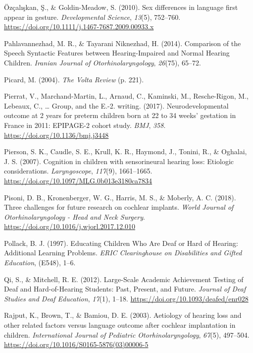 \documentclass[english,man]{apa6}
\begin{document}
\leavevmode\hypertarget{ref-ozcaliskan2010}{}%
Özçalışkan, Ş., \& Goldin-Meadow, S. (2010). Sex differences in language first appear in gesture. \emph{Developmental Science}, \emph{13}(5), 752--760. \url{https://doi.org/10.1111/j.1467-7687.2009.00933.x}

\leavevmode\hypertarget{ref-pahlavannezhad2014}{}%
Pahlavannezhad, M. R., \& Tayarani Niknezhad, H. (2014). Comparison of the Speech Syntactic Features between Hearing-Impaired and Normal Hearing Children. \emph{Iranian Journal of Otorhinolaryngology}, \emph{26}(75), 65--72.

\leavevmode\hypertarget{ref-picard2004}{}%
Picard, M. (2004). \emph{The Volta Review} (p. 221).

\leavevmode\hypertarget{ref-pierrat2017}{}%
Pierrat, V., Marchand-Martin, L., Arnaud, C., Kaminski, M., Resche-Rigon, M., Lebeaux, C., \ldots{} Group, and the E.-2. writing. (2017). Neurodevelopmental outcome at 2 years for preterm children born at 22 to 34 weeks' gestation in France in 2011: EPIPAGE-2 cohort study. \emph{BMJ}, \emph{358}. \url{https://doi.org/10.1136/bmj.j3448}

\leavevmode\hypertarget{ref-pierson2007}{}%
Pierson, S. K., Caudle, S. E., Krull, K. R., Haymond, J., Tonini, R., \& Oghalai, J. S. (2007). Cognition in children with sensorineural hearing loss: Etiologic considerations. \emph{Laryngoscope}, \emph{117}(9), 1661--1665. \url{https://doi.org/10.1097/MLG.0b013e3180ca7834}

\leavevmode\hypertarget{ref-pisoni2018}{}%
Pisoni, D. B., Kronenberger, W. G., Harris, M. S., \& Moberly, A. C. (2018). Three challenges for future research on cochlear implants. \emph{World Journal of Otorhinolaryngology - Head and Neck Surgery}. \url{https://doi.org/10.1016/j.wjorl.2017.12.010}

\leavevmode\hypertarget{ref-pollack1997}{}%
Pollack, B. J. (1997). Educating Children Who Are Deaf or Hard of Hearing: Additional Learning Problems. \emph{ERIC Clearinghouse on Disabilities and Gifted Education}, (E548), 1--6.

\leavevmode\hypertarget{ref-qi2012}{}%
Qi, S., \& Mitchell, R. E. (2012). Large-Scale Academic Achievement Testing of Deaf and Hard-of-Hearing Students: Past, Present, and Future. \emph{Journal of Deaf Studies and Deaf Education}, \emph{17}(1), 1--18. \url{https://doi.org/10.1093/deafed/enr028}

\leavevmode\hypertarget{ref-rajput2003}{}%
Rajput, K., Brown, T., \& Bamiou, D. E. (2003). Aetiology of hearing loss and other related factors versus language outcome after cochlear implantation in children. \emph{International Journal of Pediatric Otorhinolaryngology}, \emph{67}(5), 497--504. \url{https://doi.org/10.1016/S0165-5876(03)00006-5}
\end{document}
